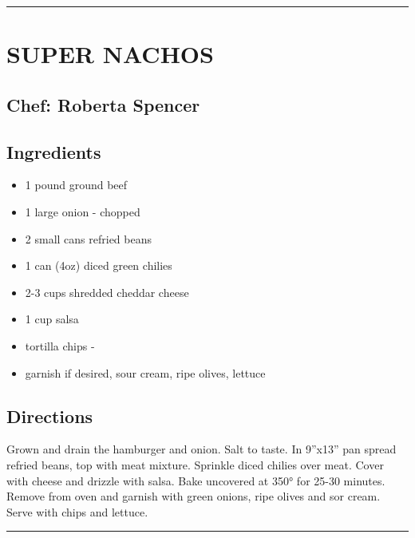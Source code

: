 \documentclass[
]{book}
\providecommand{\tightlist}{%
  \setlength{\itemsep}{0pt}\setlength{\parskip}{0pt}}
\begin{document}
\begin{center}\rule{0.5\linewidth}{0.5pt}\end{center}

\hypertarget{super-nachos}{%
\section*{SUPER NACHOS}\label{super-nachos}}


\hypertarget{chef-roberta-spencer-24}{%
\subsection*{Chef: Roberta Spencer}\label{chef-roberta-spencer-24}}


\hypertarget{ingredients-67}{%
\subsection*{Ingredients}\label{ingredients-67}}


\begin{itemize}
\tightlist
\item
  1 pound ground beef
\item
  1 large onion - chopped
\item
  2 small cans refried beans
\item
  1 can (4oz) diced green chilies
\item
  2-3 cups shredded cheddar cheese
\item
  1 cup salsa
\item
  tortilla chips -
\item
  garnish if desired, sour cream, ripe olives, lettuce
\end{itemize}

\hypertarget{directions-67}{%
\subsection*{Directions}\label{directions-67}}


Grown and drain the hamburger and onion. Salt to taste. In 9''x13'' pan spread refried beans,
top with meat mixture. Sprinkle diced chilies over meat. Cover with cheese and drizzle with salsa.
Bake uncovered at 350° for 25-30 minutes. Remove from oven and garnish with green onions, ripe olives
and sor cream. Serve with chips and lettuce.

\begin{center}\rule{0.5\linewidth}{0.5pt}\end{center}
\end{document}
